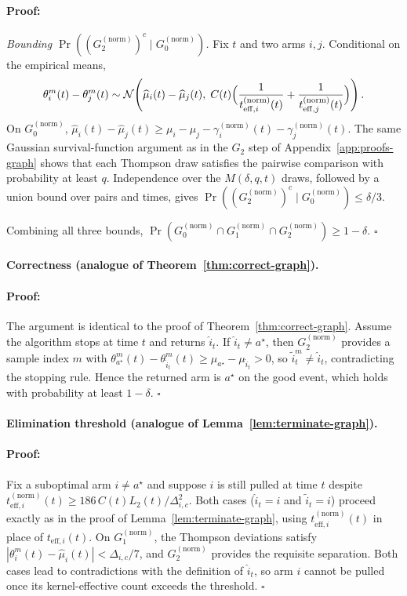 \documentclass{article}
\newenvironment{proof}{\paragraph{Proof:}}{\hfill$\square$}
\begin{document}
\begin{proof}
\emph{Bounding $\Pr((G_2^{(\mathrm{norm})})^c\mid G_0^{(\mathrm{norm})})$.}
Fix $t$ and two arms $i,j$. Conditional on the empirical means,
\[
\theta_i^m(t)-\theta_j^m(t)
\sim
\mathcal N\!\left(
\widehat\mu_i(t)-\widehat\mu_j(t),\;
C(t)\Bigl(\frac{1}{t_{\mathrm{eff},i}^{(\mathrm{norm})}(t)}+\frac{1}{t_{\mathrm{eff},j}^{(\mathrm{norm})}(t)}\Bigr)
\right).
\]
On $G_0^{(\mathrm{norm})}$, $\widehat\mu_i(t)-\widehat\mu_j(t)\ge\mu_i-\mu_j-\gamma_i^{(\mathrm{norm})}(t)-\gamma_j^{(\mathrm{norm})}(t)$. The same Gaussian survival-function argument as in the $G_2$ step of Appendix~\ref{app:proofs-graph} shows that each Thompson draw satisfies the pairwise comparison with probability at least $q$. Independence over the $M(\delta,q,t)$ draws, followed by a union bound over pairs and times, gives $\Pr((G_2^{(\mathrm{norm})})^c\mid G_0^{(\mathrm{norm})})\le\delta/3$.

Combining all three bounds,
$\Pr(G_0^{(\mathrm{norm})}\cap G_1^{(\mathrm{norm})}\cap G_2^{(\mathrm{norm})})\ge 1-\delta$.
\end{proof}

\paragraph{Correctness (analogue of Theorem~\ref{thm:correct-graph}).}

\begin{proof}
The argument is identical to the proof of Theorem~\ref{thm:correct-graph}. Assume the algorithm stops at time $t$ and returns $\widehat i_t$. If $\widehat i_t\neq a^\star$, then $G_2^{(\mathrm{norm})}$ provides a sample index $m$ with $\theta_{a^\star}^m(t)-\theta_{\widehat i_t}^m(t)\ge \mu_{a^\star}-\mu_{\widehat i_t}>0$, so $\widetilde i_t^m\neq \widehat i_t$, contradicting the stopping rule. Hence the returned arm is $a^\star$ on the good event, which holds with probability at least $1-\delta$.
\end{proof}

\paragraph{Elimination threshold (analogue of Lemma~\ref{lem:terminate-graph}).}

\begin{proof}
Fix a suboptimal arm $i\neq a^\star$ and suppose $i$ is still pulled at time $t$ despite $t_{\mathrm{eff},i}^{(\mathrm{norm})}(t)\ge 186\,C(t)L_2(t)/\Delta_{i,c}^2$. Both cases ($\widehat i_t=i$ and $\widetilde i_t=i$) proceed exactly as in the proof of Lemma~\ref{lem:terminate-graph}, using $t_{\mathrm{eff},i}^{(\mathrm{norm})}(t)$ in place of $t_{\mathrm{eff},i}(t)$. On $G_1^{(\mathrm{norm})}$, the Thompson deviations satisfy $|\theta_i^m(t)-\widehat\mu_i(t)|<\Delta_{i,c}/7$, and $G_2^{(\mathrm{norm})}$ provides the requisite separation. Both cases lead to contradictions with the definition of $\widehat i_t$, so arm $i$ cannot be pulled once its kernel-effective count exceeds the threshold.
\end{proof}
\end{document}
